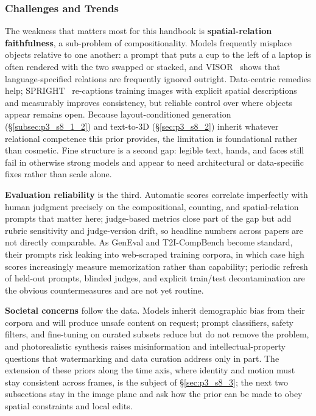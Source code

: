\subsubsection{Challenges and Trends}
The weakness that matters most for this handbook is \textbf{spatial-relation faithfulness}, a sub-problem of compositionality.
Models frequently misplace objects relative to one another: a prompt that puts a cup to the left of a laptop is often rendered with the two swapped or stacked, and VISOR~\cite{gokhale2022visor} shows that language-specified relations are frequently ignored outright.
Data-centric remedies help; SPRIGHT~\cite{chatterjee2024spright} re-captions training images with explicit spatial descriptions and measurably improves consistency, but reliable control over where objects appear remains open.
Because layout-conditioned generation (§\ref{subsec:p3_s8_1_2}) and text-to-3D (§\ref{sec:p3_s8_2}) inherit whatever relational competence this prior provides, the limitation is foundational rather than cosmetic.
Fine structure is a second gap: legible text, hands, and faces still fail in otherwise strong models and appear to need architectural or data-specific fixes rather than scale alone.

\textbf{Evaluation reliability} is the third.
Automatic scores correlate imperfectly with human judgment precisely on the compositional, counting, and spatial-relation prompts that matter here; judge-based metrics close part of the gap but add rubric sensitivity and judge-version drift, so headline numbers across papers are not directly comparable.
As GenEval and T2I-CompBench become standard, their prompts risk leaking into web-scraped training corpora, in which case high scores increasingly measure memorization rather than capability; periodic refresh of held-out prompts, blinded judges, and explicit train/test decontamination are the obvious countermeasures and are not yet routine.

\textbf{Societal concerns} follow the data.
Models inherit demographic bias from their corpora and will produce unsafe content on request; prompt classifiers, safety filters, and fine-tuning on curated subsets reduce but do not remove the problem, and photorealistic synthesis raises misinformation and intellectual-property questions that watermarking and data curation address only in part.
The extension of these priors along the time axis, where identity and motion must stay consistent across frames, is the subject of §\ref{sec:p3_s8_3}; the next two subsections stay in the image plane and ask how the prior can be made to obey spatial constraints and local edits.

